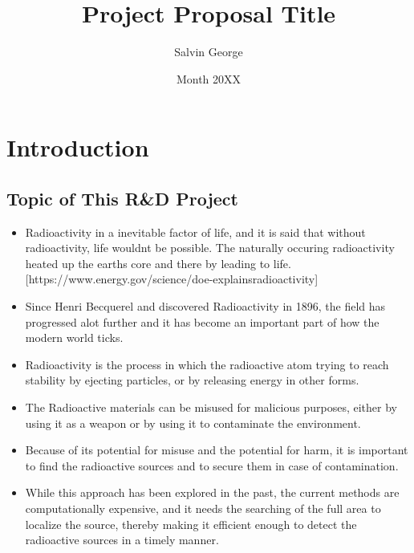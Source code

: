 \documentclass[rnd]{mas_proposal}
\title{Project Proposal Title}
\author{Salvin George}
\date{Month 20XX}
\begin{document}
\maketitle

\pagestyle{plain}

\section{Introduction}

\subsection{Topic of This R\&D Project}
\begin{itemize}
    \item Radioactivity in a inevitable factor of life, and it is said that without radioactivity, life wouldnt be possible. The naturally occuring radioactivity heated up the earths core and there by leading to life. [https://www.energy.gov/science/doe-explainsradioactivity]
    \item Since Henri Becquerel and discovered Radioactivity in 1896, the field has progressed alot further and it has become an important part of how the modern world ticks.
    \item Radioactivity is the process in which the radioactive atom trying to reach stability by ejecting particles, or by releasing energy in other forms.
    \item The Radioactive materials can be misused for malicious purposes, either by using it as a weapon or by using it to contaminate the environment.
    \item Because of its potential for misuse and the potential for harm, it is important to find the radioactive sources and to secure them in case of contamination. 
    \item While this approach has been explored in the past, the current methods are computationally expensive, and it needs the searching of the full area to localize the source, thereby making it efficient enough to detect the radioactive sources in a timely manner.

\end{itemize}
\end{document}
